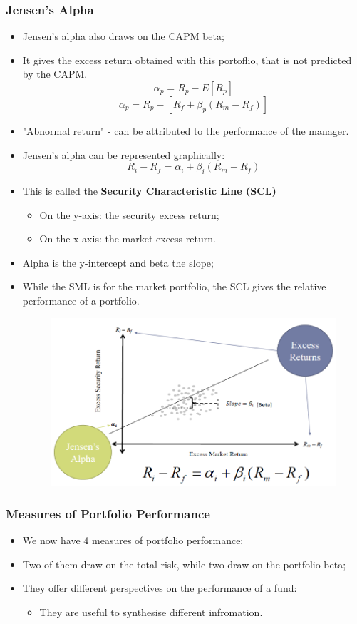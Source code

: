 \documentclass[11pt,a4paper]{report}
\begin{document}
\subsubsection{Jensen's Alpha}
\begin{itemize}
    \item Jensen's alpha also draws on the CAPM beta;
    \item It gives the excess return obtained with this portoflio, that is not predicted by the CAPM.
    \[\alpha_p = R_p - E[R_p]\]
    \[\alpha_p = R_p - [R_f + \beta_p(R_m - R_f)]\]
    \item "Abnormal return" - can be attributed to the performance of the manager.
    \item Jensen's alpha can be represented graphically:
    \[R_i - R_f = \alpha_i + \beta_i(R_m - R_f)\]
    \item This is called the \textbf{Security Characteristic Line (SCL)}
    \begin{itemize}
        \item On the y-axis: the security excess return;
        \item On the x-axis: the market excess return.
    \end{itemize}
    \item Alpha is the y-intercept and beta the slope;
    \item While the SML is for the market portfolio, the SCL gives the relative performance of a portfolio.
    \begin{figure}[h]
        \centering
        \includegraphics[width=\textwidth]{images/SCL.png}
    \end{figure}
\end{itemize}
\subsubsection{Measures of Portfolio Performance}
\begin{itemize}
    \item We now have 4 measures of portfolio performance;
    \item Two of them draw on the total risk, while two draw on the portfolio beta;
    \item They offer different perspectives on the performance of a fund:
    \begin{itemize}
        \item They are useful to synthesise different infromation.
    \end{itemize}
\end{itemize}
\end{document}
